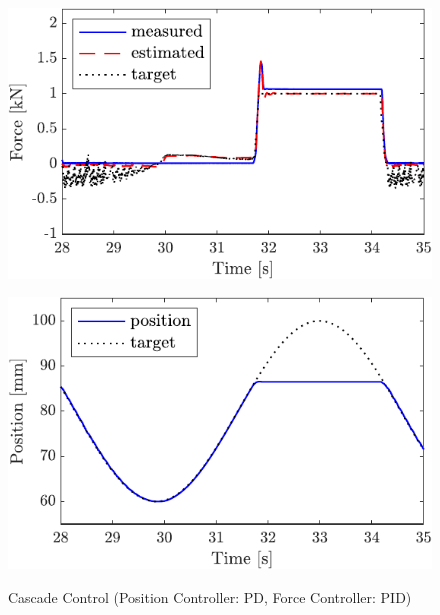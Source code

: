 \begin{figure}[t]
    \begin{minipage}{\minipageratio\hsize}
    \centering
        \includegraphics[keepaspectratio, scale = \minifigscale]{contents/IntegrationControl/figure/SECASQ/crop-FBcsqtch_PID_Notrq_posPIDadjust_force.pdf}
        \label{fig5:crop-FBcsqtch_PID_Notrq_posPIDadjust_force}
    \end{minipage}
    \begin{minipage}{\minipageratio\hsize}
    \centering
        \includegraphics[keepaspectratio, scale = \minifigscale]{contents/IntegrationControl/figure/SECASQ/crop-FBcsqtch_PID_Notrq_posPIDadjust_pos.pdf}
        \label{fig5:crop-FBcsqtch_PID_Notrq_posPIDadjust_pos}
    \end{minipage}
    \caption{Cascade Control (Position Controller: PD, Force Controller: PID)}  
    \label{fig5:crop-FBcsqtch_PID_Notrq_posPIDadjust}
\end{figure}

